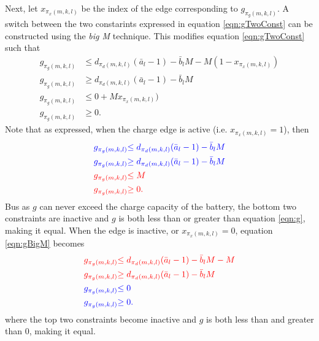 Next, let $x_{\pi_x(m,k,l)}$ be the index of the edge corresponding to $g_{\pi_g(m,k,l)}$.  A switch between the two constarints expressed in equation \ref{eqn:gTwoConst} can be constructed using the \textit{big M} technique.  This modifies equation \ref{eqn:gTwoConst} such that
\begin{equation}\label{eqn:gBigM}
	\begin{aligned}
		g_{\pi_g(m,k,l)}  &\le d_{\pi_d(m,k,l)}(\bar{a}_l - 1) - \bar{b}_lM - M(1 - x_{\pi_x(m,k,l)})\\
		g_{\pi_g(m,k,l)}  &\ge d_{\pi_d(m,k,l)}(\bar{a}_l - 1) - \bar{b}_lM \\
		g_{\pi_g(m,k,l)} &\le 0 + Mx_{\pi_x(m,k,l)})\\
		g_{\pi_g(m,k,l)} &\ge 0.  
	\end{aligned}
\end{equation}
Note that as expressed, when the charge edge is active (i.e. $x_{\pi_x(m,k,l)} = 1$), then 
\begin{equation}
	\begin{aligned}
		\color{blue}{g_{\pi_g(m,k,l)}}  &\color{blue}{\le d_{\pi_d(m,k,l)}(\bar{a}_l - 1) - \bar{b}_lM} \\
		\color{blue}{g_{\pi_g(m,k,l)}}  &\color{blue}{\ge d_{\pi_d(m,k,l)}(\bar{a}_l - 1) - \bar{b}_lM} \\
		\color{red}{g_{\pi_g(m,k,l)}} & \color{red}{\le M} \\
		\color{red}{g_{\pi_g(m,k,l)}} & \color{red}{\ge 0}.  
	\end{aligned}
\end{equation}
Bus as $g$ can never exceed the charge capacity of the battery, the bottom two constraints are inactive and $g$ is both less than or greater than equation \ref{eqn:g}, making it equal.  When the edge is inactive, or $x_{\pi_x(m,k,l)} = 0$, equation \ref{eqn:gBigM} becomes
\begin{equation}
	\begin{aligned}
		\color{red}{g_{\pi_g(m,k,l)}}  &\color{red}{\le d_{\pi_d(m,k,l)}(\bar{a}_l - 1) - \bar{b}_lM - M} \\
		\color{red}{g_{\pi_g(m,k,l)}}  &\color{red}{\ge d_{\pi_d(m,k,l)}(\bar{a}_l - 1) - \bar{b}_lM} \\
		\color{blue}{g_{\pi_g(m,k,l)}} &\color{blue}{\le 0} \\
		\color{blue}{g_{\pi_g(m,k,l)}} &\color{blue}{\ge 0}.  
	\end{aligned}
\end{equation}
where the top two constraints become inactive and $g$ is both less than and greater than 0, making it equal.
